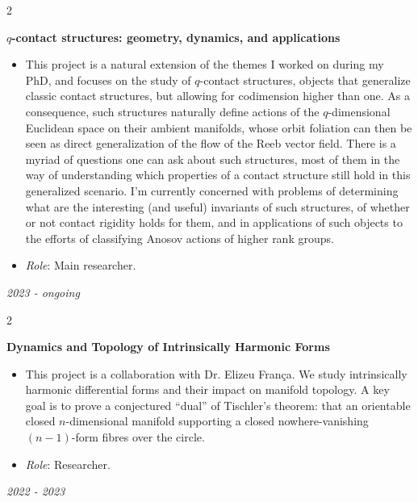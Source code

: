 \documentclass[10pt, letterpaper]{article}
\newenvironment{highlights}{
    \begin{itemize}[
        topsep=0.10 cm,
        parsep=0.10 cm,
        partopsep=0pt,
        itemsep=0pt,
        leftmargin=0.4 cm + 10pt
    ]
}{
    \end{itemize}
} %
\newenvironment{twocolentry}[2][]{
    \onecolentry
    \def\secondColumn{#2}
    \setcolumnwidth{\fill, 5 cm}
    \begin{paracol}{2}
    \small 
}{
    \switchcolumn \raggedleft \secondColumn
    \end{paracol}
    \endonecolentry
} %
\begin{document}
    \begin{twocolentry}{\textit{2023 - ongoing }}
        \textbf{\(q\)-contact structures: geometry, dynamics, and applications}
        \begin{highlights}
            \item This project is a natural extension of the themes I worked on during my PhD, and focuses on the study of \(q\)-contact structures, objects that generalize classic contact structures, but allowing for codimension higher than one. As a consequence, such structures naturally define actions of the \(q\)-dimensional Euclidean space on their ambient manifolds, whose orbit foliation can then be seen as direct generalization of the flow of the Reeb vector field. There is a myriad of questions one can ask about such structures, most of them in the way of understanding which properties of a contact structure still hold in this generalized scenario. I'm currently concerned with problems of determining what are the interesting (and useful) invariants of such structures, of whether or not contact rigidity holds for them,
            and in applications of such objects to the efforts of classifying Anosov actions of higher rank groups.
            \item \textit{Role}: Main researcher.
        \end{highlights}
    \end{twocolentry} \vspace{0.1cm}
    
    \begin{twocolentry}{\textit{2022 - 2023 }}
        \textbf{Dynamics and Topology of Intrinsically Harmonic Forms}
        \begin{highlights}
            \item This project is a collaboration with Dr. Elizeu França. We study intrinsically harmonic differential forms and their impact on manifold topology. A key goal is to prove a conjectured “dual” of Tischler’s theorem: that an orientable closed \(n\)-dimensional manifold supporting a closed nowhere-vanishing \((n-1)\)-form fibres over the circle.
            \item \textit{Role}: Researcher.
        \end{highlights}
    \end{twocolentry} \vspace{0.1cm}
    
\end{document}
